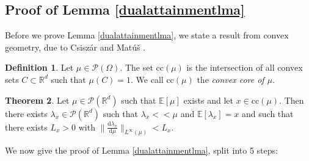 \documentclass[letterpaper]{amsart}
\newcommand{\RR}{\mathbb{R}}
\newcommand{\EE}{\mathbb{E}}
\newcommand{\dd}{\mathrm{d}}
\theoremstyle{definition}
\newtheorem{thm}{Theorem}[section]
\newtheorem{definition}[thm]{Definition}
\begin{document}
\subsection{Proof of Lemma \ref{dualattainmentlma}}
Before we prove Lemma \ref{dualattainmentlma}, we state a result from convex geometry, due to Csiszár and Matú\v{s} \cite{csiszar2001}.
\begin{definition}\cite[p 177]{csiszar2001}
	Let $\mu\in\mathcal P(\Omega)$. The set $\text{cc}(\mu)$ is the intersection of all convex sets $C\subset\RR^d$ such that $\mu(C)=1$. We call $\text{cc}(\mu)$ the \textit{convex core of $\mu$}.
\end{definition}
\begin{thm}\cite[Thm 3]{csiszar2001}\label{csiszarthm}
	Let $\mu\in\mathcal P(\RR^d)$ such that $\EE[\mu]$ exists and let $x\in\text{cc}(\mu)$. Then there exists $\lambda_x\in\mathcal P(\RR^d)$ such that $\lambda_x<<\mu$ and $\EE[\lambda_x]=x$ and such that there exists $L_x>0$ with $\|\frac{\dd\lambda_x}{\dd\mu}\|_{L^\infty(\mu)}<L_x$.
\end{thm}
We now give the proof of Lemma \ref{dualattainmentlma}, split into 5 steps:
\end{document}
